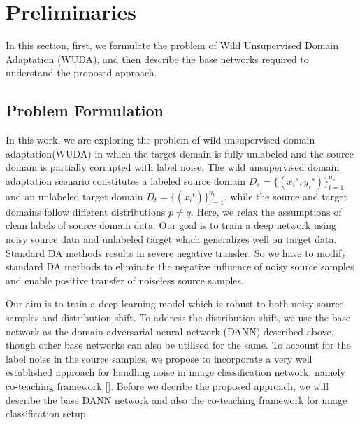\section{Preliminaries}

In this section, first, we formulate the problem of Wild Unsupervised Domain Adaptation (WUDA), and then describe the base networks required to understand the proposed approach.

\subsection{Problem Formulation}
In this work, we are exploring the problem of wild unsupervised domain adaptation(WUDA) in which the target domain is fully unlabeled and the source domain is partially corrupted with label noise. The wild unsupervised domain adaptation scenario constitutes a labeled source domain ${D}_s = \{({x_i}^s, {y_i}^s)\}_{i=1}^{n_s}$ and an unlabeled target domain ${D}_t = \{({x_i}^t)\}_{i=1}^{n_t}$, while the source and target domains follow different distributions $p \neq q$. Here, we relax the assumptions of clean labels of source domain data.  Our goal is to train a deep network using noisy source data and unlabeled target which generalizes well on target data. Standard DA methods results in severe negative transfer. So we have to modify standard DA methods to eliminate the negative influence of noisy source samples and enable positive transfer of noiseless source samples.

Our aim is to train a deep learning model which is robust to both noisy source samples and distribution shift. 
To address the distribution shift, we use the base network as the domain adversarial neural network (DANN) described above, though other base networks can also be utilised for the same.
To account for the label noise in the source samples, we propose to incorporate a very well established approach for handling noise in image classification network, namely co-teaching framework [].
Before we decribe the proposed approach, we will describe the base DANN network and also the co-teaching framework for image classification setup.

